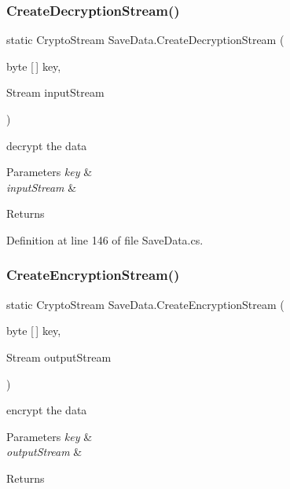 \subsubsection{\texorpdfstring{Create\+Decryption\+Stream()}{CreateDecryptionStream()}}
{\footnotesize\ttfamily static Crypto\+Stream Save\+Data.\+Create\+Decryption\+Stream (\begin{DoxyParamCaption}\item[{byte \mbox{[}$\,$\mbox{]}}]{key,  }\item[{Stream}]{input\+Stream }\end{DoxyParamCaption})\hspace{0.3cm}{\ttfamily [static]}}



decrypt the data 


\begin{DoxyParams}{Parameters}
{\em key} & \\
\hline
{\em input\+Stream} & \\
\hline
\end{DoxyParams}
\begin{DoxyReturn}{Returns}

\end{DoxyReturn}


Definition at line 146 of file Save\+Data.\+cs.

\mbox{\label{class_save_data_abefac0386b4128e4444b28554e3bdce3}} 
\subsubsection{\texorpdfstring{Create\+Encryption\+Stream()}{CreateEncryptionStream()}}
{\footnotesize\ttfamily static Crypto\+Stream Save\+Data.\+Create\+Encryption\+Stream (\begin{DoxyParamCaption}\item[{byte \mbox{[}$\,$\mbox{]}}]{key,  }\item[{Stream}]{output\+Stream }\end{DoxyParamCaption})\hspace{0.3cm}{\ttfamily [static]}}



encrypt the data 


\begin{DoxyParams}{Parameters}
{\em key} & \\
\hline
{\em output\+Stream} & \\
\hline
\end{DoxyParams}
\begin{DoxyReturn}{Returns}

\end{DoxyReturn}


